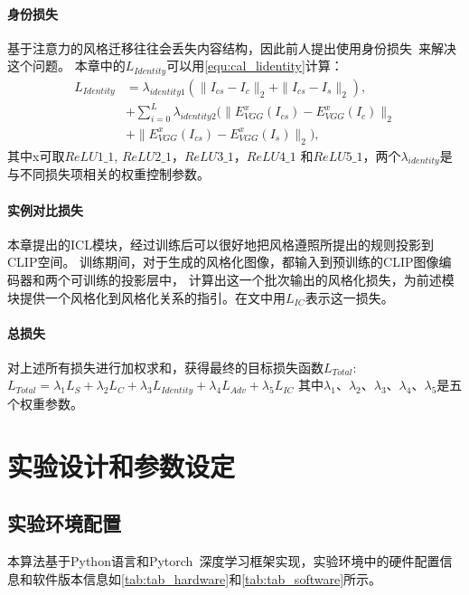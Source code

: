 \paragraph{身份损失}
基于注意力的风格迁移往往会丢失内容结构，因此前人提出使用身份损失~\cite{zhao2020unpaired}来解决这个问题。
本章中的$L_{Identity}$可以用\autoref{equ:cal_lidentity}计算：
\begin{equation}
    \label{equ:cal_lidentity}
    \begin{aligned}
        L_{Identity}& =\lambda_{identity1}(\parallel I_{cs}-I_c\parallel_2+\parallel I_{cs}-I_s\parallel_2), \\
        &+\sum_{i=0}^L\lambda_{identity2}(\parallel E_{VGG}^x(I_{cs})-E_{VGG}^x(I_c)\parallel_2 \\
        &+\parallel E_{VGG}^x(I_{cs})-E_{VGG}^x(I_s)\parallel_2),
        \end{aligned}
\end{equation}
其中x可取$ReLU1\_1$, $ReLU2\_1$，$ReLU3\_1$，$ReLU4\_1$
和$ReLU5\_1$，两个$\lambda_{identity}$是与不同损失项相关的权重控制参数。



\paragraph{实例对比损失}
本章提出的ICL模块，经过训练后可以很好地把风格遵照所提出的规则投影到CLIP空间。
训练期间，对于生成的风格化图像，都输入到预训练的CLIP图像编码器和两个可训练的投影层中，
计算出这一个批次输出的风格化损失，为前述模块提供一个风格化到风格化关系的指引。在文中用$L_{IC}$表示这一损失。
\paragraph{总损失}
对上述所有损失进行加权求和，获得最终的目标损失函数$L_{Total}$:\(L_{Total}= \lambda_{1}L_{S}+\lambda_{2}L_{C}+\lambda_{3}L_{Identity}+\lambda_{4}L_{Adv}+\lambda_{5}L_{IC}\)
其中$\lambda_1$、$\lambda_2$、$\lambda_3$、$\lambda_4$、$\lambda_5$是五个权重参数。

\section{实验设计和参数设定}
\subsection{实验环境配置}
本算法基于Python语言和Pytorch~\cite{paszke2019pytorch}深度学习框架实现，实验环境中的硬件配置信息和软件版本信息如\autoref{tab:tab_hardware}和\autoref{tab:tab_software}所示。


